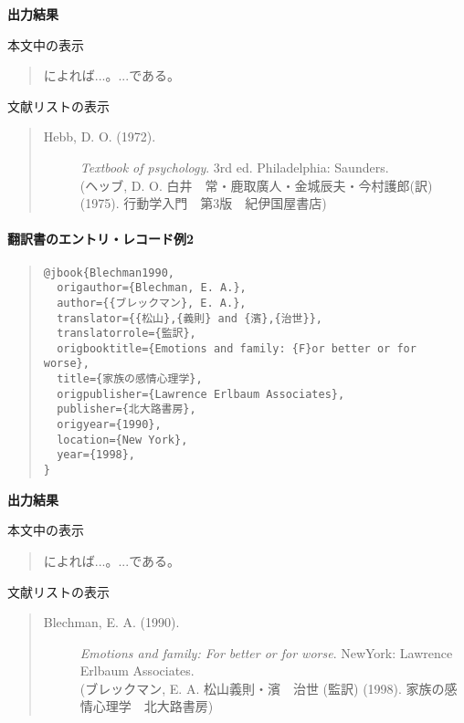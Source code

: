 \documentclass[12pt]{ltjsarticle}
\begin{document}
\textbf{出力結果}

本文中の表示
\begin{quote}
\textcite{Hebb1972}によれば...。...である\parencite{Hebb1972}。
\end{quote}

文献リストの表示
\begin{quote}
\begin{description}
  \item[\textrm{Hebb, D. O. (1972).}]\textit{Textbook of psychology}. 3rd ed. Philadelphia: Saunders.\\
(ヘッブ, D. O. 白井　常・鹿取廣人・金城辰夫・今村護郎(訳)(1975). 行動学入門　第3版　紀伊国屋書店)
\end{description}
\end{quote}


\paragraph{翻訳書のエントリ・レコード例2}

\begin{quote}
\begin{verbatim}
@jbook{Blechman1990,
  origauthor={Blechman, E. A.},
  author={{ブレックマン}, E. A.},
  translator={{松山},{義則} and {濱},{治世}},
  translatorrole={監訳},
  origbooktitle={Emotions and family: {F}or better or for worse},
  title={家族の感情心理学},
  origpublisher={Lawrence Erlbaum Associates},
  publisher={北大路書房},
  origyear={1990},
  location={New York},
  year={1998},
}
\end{verbatim}
\end{quote}


\textbf{出力結果}

本文中の表示
\begin{quote}
\textcite{Blechman1990}によれば...。...である\parencite{Blechman1990}。
\end{quote}

文献リストの表示

\begin{quote}
\begin{description}
  \item[\textrm{Blechman, E. A. (1990).}]\textit{Emotions and family: For better or for worse}. NewYork: Lawrence Erlbaum Associates.\\
(ブレックマン, E. A. 松山義則・濱　治世 (監訳) (1998). 家族の感情心理学　北大路書房)
\end{description}
\end{quote}
\end{document}
